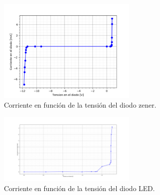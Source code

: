 \documentclass[a4paper]{article}
\begin{document}
\begin{figure}[H]
	\centering
	\includegraphics[width=0.6\textwidth]{CurvaZenerEntera}
	\caption{Corriente en función de la tensión del diodo zener.}
	\label{fig:diodozen}
\end{figure}

\begin{figure}[H]
	\centering
	\includegraphics[width=0.6\textwidth]{CurvaDiodosLed}
	\caption{Corriente en función de la tensión del diodo LED.}
	\label{fig:diodoled}
\end{figure}



%
%	
%
%
%
%	
%	
\end{document}
